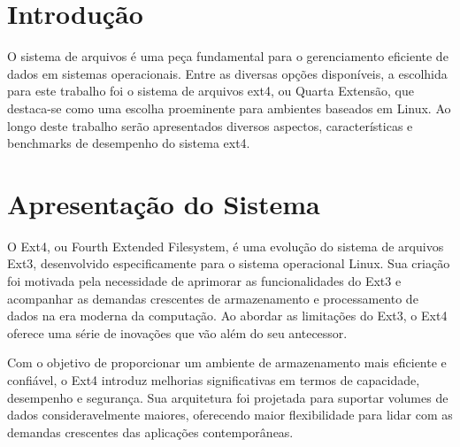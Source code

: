 \documentclass[
	12pt,				%
	openright,			%
	oneside,			%
	a4paper,			%
	chapter=TITLE,		%
	english,			%
	french,				%
	spanish,			%
	brazil				%
	]{abntex2}
\theoremstyle{definition}
\begin{document}
\frenchspacing 

\imprimircapa


\imprimirfolhaderosto

\newpage

\setlength{\absparsep}{18pt} %

\tableofcontents*
\cleardoublepage
\textual


\chapter{Introdução}
O sistema de arquivos é uma peça fundamental para o gerenciamento eficiente de dados em 
sistemas operacionais. Entre as diversas opções disponíveis, a escolhida para este trabalho 
foi o sistema de arquivos ext4, ou Quarta Extensão, que destaca-se como uma escolha proeminente para ambientes 
baseados em Linux. Ao longo deste trabalho serão apresentados diversos aspectos, características e benchmarks de desempenho 
do sistema ext4.

\chapter{Apresentação do Sistema}

O Ext4, ou Fourth Extended Filesystem, é uma evolução do sistema de arquivos Ext3, desenvolvido 
especificamente para o sistema operacional Linux. Sua criação foi motivada pela necessidade 
de aprimorar as funcionalidades do Ext3 e acompanhar as demandas crescentes de armazenamento e 
processamento de dados na era moderna da computação. Ao abordar as limitações do Ext3, o Ext4 
oferece uma série de inovações que vão além do seu antecessor.

Com o objetivo de proporcionar um ambiente de armazenamento mais eficiente e confiável, o 
Ext4 introduz melhorias significativas em termos de capacidade, desempenho e segurança. 
Sua arquitetura foi projetada para suportar volumes de dados consideravelmente maiores, 
oferecendo maior flexibilidade para lidar com as demandas crescentes das aplicações contemporâneas. 
\end{document}
